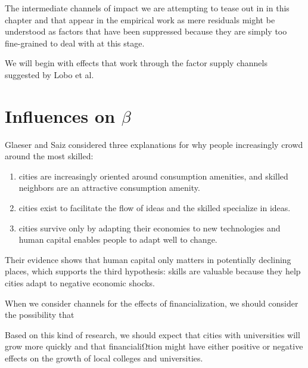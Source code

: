The intermediate channels of impact we are attempting to tease out  in in this chapter and that appear in the empirical work as mere residuals might be understood as factors that have been suppressed because they are simply too fine-grained to deal with at this stage.

We will begin with effects that work through the factor supply channels suggested by Lobo et al. 
\section{Influences on $\beta$}
Glaeser and Saiz \cite{glaeserRiseSkilledCity2003} considered three explanations for why people increasingly crowd around the most skilled:  
\begin {enumerate} 
\item cities are increasingly oriented around consumption amenities, and skilled neighbors are an attractive consumption amenity.
\item  cities exist to facilitate the flow of ideas and the skilled specialize in ideas.
\item cities survive only by adapting their economies to new technologies and human capital enables people to adapt well to change.
\end{enumerate}
Their evidence shows that human capital only matters in potentially declining places, which  supports the third hypothesis: skills are valuable because they help cities adapt  to negative economic shocks.

 When we consider channels for the effects of financialization, we should consider the possibility that 
 
Based on this kind of research, we should expect that cities with universities will grow more quickly and that financialiΩtion might have either positive or negative effects on the growth of local colleges and universities. 

